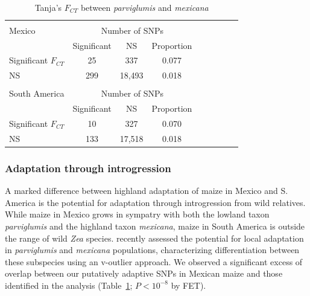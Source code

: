 {{\begin{table}[tb]
\begin{center}
 \caption[]{Tanja's $F_{CT}$ between \emph{parviglumis} and \emph{mexicana}\hspace*{0.3cm}}
  \textbf{}\\[-2mm]
{\fontsize{7}{11}\sf
    \begin{tabular}{lcccccccl} 
    \hline
       & & \\[-3mm]
Mexico     & \multicolumn{3}{c}{Number of SNPs}  \\
                                  & Significant & NS          & Proportion  \\
Significant $F_{CT}$ & 25              &   337       & 0.077\\ 
NS                             & 299            &  18,493   & 0.018\\
      \hline
    & & \\[-3mm]
South America     & \multicolumn{3}{c}{Number of SNPs} \\
                                     & Significant & NS           & Proportion  \\
Significant $F_{CT}$    & 10              &   327        & 0.070\\ 
NS                                & 133            &  17,518    & 0.018\\[1mm]
    \hline
    \end{tabular}
    \label{tanja}  %
}
\end{center}
\end{table}
\renewcommand{\arraystretch}{1}



\subsubsection{Adaptation through introgression}

A marked difference between highland adaptation of maize in Mexico and S. America is the potential for adaptation through introgression from wild relatives.  
While maize in Mexico grows in sympatry with both the lowland taxon \textit{parviglumis} and the highland taxon \textit{mexicana}, maize in South America is outside the range of wild \textit{Zea} species.
\citet{Pyhajarvi2013} recently assessed the potential for local adaptation in \textit{parviglumis} and \textit{mexicana} populations, characterizing differentiation between these subspecies using an v-outlier approach.
We observed a significant excess of overlap between our putatively adaptive SNPs in Mexican maize and those identified in the \citet{Pyhajarvi2013} analysis (Table~\ref{tanja}; $P<10^{-8}$ by FET). 

}}
